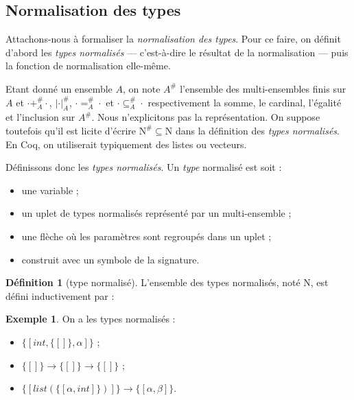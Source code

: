 \documentclass[a4paper]{report}
\theoremstyle{definition}
\newtheorem{definition}[theoreme]{Définition}
\newtheorem{exemple}[theoreme]{Exemple}
\newcommand{\mset}[1]{\{\![#1]\!\}}
\newcommand{\V}{\mathscr{V}}
\newcommand{\F}{\mathscr{F}}
\newcommand{\N}{\mathrm{N}}
\begin{document}

\subsection{Normalisation des types}

Attachons-nous à formaliser la \emph{normalisation des types}. Pour ce faire, on définit d'abord les \emph{types normalisés} — c'est-à-dire le résultat de la normalisation — puis la fonction de normalisation elle-même.

Etant donné un ensemble $A$, on note $A^\#$ l'ensemble des multi-ensembles finis sur $A$ et $\cdot +^\#_A \cdot$, $| \cdot |^\#_A$, $\cdot =^\#_A \cdot$ et $\cdot \subseteq^\#_A \cdot$ respectivement la somme, le cardinal, l'égalité et l'inclusion sur $A^\#$. Nous n'explicitons pas la représentation. On suppose toutefois qu'il est licite d'écrire $\N^\# \subseteq \N$ dans la définition des \emph{types normalisés}. En Coq, on utiliserait typiquement des listes ou vecteurs.

Définissons donc les \emph{types normalisés}. Un \emph{type} normalisé est soit :
\begin{itemize}[nosep]
  \item une variable ;
  \item un uplet de types normalisés représenté par un multi-ensemble ;
  \item une flèche où les paramètres sont regroupés dans un uplet ;
  \item construit avec un symbole de la signature.
\end{itemize}

\begin{definition}[type normalisé]
  L'ensemble des types normalisés, noté $\N$, est défini inductivement par :
\end{definition}

\begin{exemple}
  On a les types normalisés :
  \begin{itemize}
    \item $\mset{int, \mset{}, \alpha}$ ;
    \item $\mset{} \rightarrow \mset{} \rightarrow \mset{}$ ;
    \item $\mset{list (\mset{\alpha, int})} \rightarrow \mset{\alpha, \beta}$.
  \end{itemize}
\end{exemple}
\end{document}
